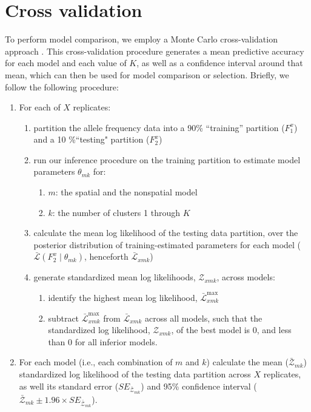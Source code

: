 \documentclass[12pt]{article}
\begin{document}
\section{Cross validation}\label{Xvalidation}
To perform model comparison, we employ a Monte Carlo cross-validation approach \citep{picard1984}.
This cross-validation procedure generates a mean predictive accuracy for each model and each value of $K$, 
as well as a confidence interval around that mean,
which can then be used for model comparison or selection.
Briefly, we follow the following procedure:
\begin{enumerate}
\item For each of $X$ replicates:
	\begin{enumerate}
		\item partition the allele frequency data into a 90\% ``training'' partition ($F^x_1$) and a 10 \%``testing" partition ($F^x_2$) \label{partition}
		\item run our inference procedure on the training partition to estimate model parameters $\theta_{mk}$ for: \label{inference}
			\begin{enumerate}
				\item $m$: the spatial and the nonspatial model
				\item $k$: the number of clusters 1 through $K$
			\end{enumerate}	
	\item calculate the mean log likelihood of the testing data partition, 
	over the posterior distribution of training-estimated parameters for each model 
	($\bar{\mathcal{L}}(F^x_2 \mid \theta_{mk})$, henceforth $\bar{\mathcal{L}}_{xmk}$) \label{lnL}
	\item generate standardized mean log likelihoods, $\mathcal{Z}_{xmk}$, across models: \label{standardize}
		\begin{enumerate}
			\item identify the highest mean log likelihood, $\bar{\mathcal{L}}^\text{max}_{xmk}$
			\item subtract $\bar{\mathcal{L}}^\text{max}_{xmk}$ from $\bar{\mathcal{L}}_{xmk}$ across all models,
				such that the standardized log likelihood, $\mathcal{Z}_{xmk}$, of the best model is 0,
				and less than 0 for all inferior models. 
		\end{enumerate}
	\end{enumerate}
\item For each model (i.e., each combination of $m$ and $k$) calculate 
	the mean ($	\bar{\mathcal{Z}}_{mk} $) standardized log likelihood of the testing data partition across $X$ replicates, 
	as well its standard error ($SE_{\bar{\mathcal{Z}}_{mk}}$) and
        95\% confidence interval ($\bar{\mathcal{Z}}_{mk} \pm 1.96 \times SE_{\bar{\mathcal{Z}}_{mk}}$).
\end{enumerate}
\end{document}
